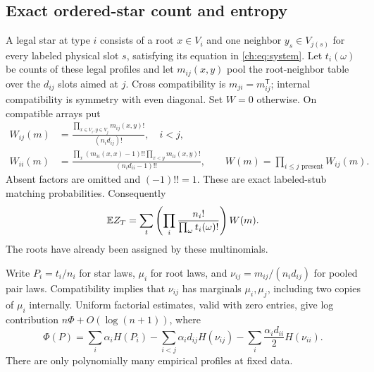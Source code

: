 \subsection{Exact ordered-star count and entropy}
A legal star at type $i$ consists of a root $x\in V_i$ and one neighbor $y_s\in V_{j(s)}$ for every labeled physical slot $s$, satisfying its equation in \eqref{ch:eq:system}. Let $t_i(\omega)$ be counts of these legal profiles and let $m_{ij}(x,y)$ pool the root-neighbor table over the $d_{ij}$ slots aimed at $j$. Cross compatibility is $m_{ji}=m_{ij}^{\mathsf T}$; internal compatibility is symmetry with even diagonal. Set $W=0$ otherwise. On compatible arrays put
\begin{align}
 W_{ij}(m)&=\frac{\prod_{x\in V_i,y\in V_j}m_{ij}(x,y)!}{(n_id_{ij})!},\quad i<j,\label{ch:eq:cross}\\
 W_{ii}(m)&=\frac{\prod_x(m_{ii}(x,x)-1)!!\prod_{x<y}m_{ii}(x,y)!}{(n_id_{ii}-1)!!},
 \qquad W(m)=\prod_{i\le j\text{ present}}W_{ij}(m).
 \label{ch:eq:internal}
\end{align}
Absent factors are omitted and $(-1)!!=1$. These are exact labeled-stub matching probabilities. Consequently
\begin{equation}\label{eq:fmp-exact-types}
 \mathbb E Z_T=\sum_t\left(\prod_i\frac{n_i!}{\prod_\omega t_i(\omega)!}\right)W(m).
\end{equation}
The roots have already been assigned by these multinomials.

Write $P_i=t_i/n_i$ for star laws, $\mu_i$ for root laws, and $\nu_{ij}=m_{ij}/(n_id_{ij})$ for pooled pair laws. Compatibility implies that $\nu_{ij}$ has marginals $\mu_i,\mu_j$, including two copies of $\mu_i$ internally. Uniform factorial estimates, valid with zero entries, give log contribution $n\Phi+O(\log(n+1))$, where
\begin{equation}\label{ch:eq:entropy}
 \Phi(P)=\sum_i\alpha_iH(P_i)
 -\sum_{i<j}\alpha_id_{ij}H(\nu_{ij})
 -\sum_i\frac{\alpha_id_{ii}}2H(\nu_{ii}).
\end{equation}
There are only polynomially many empirical profiles at fixed data.

